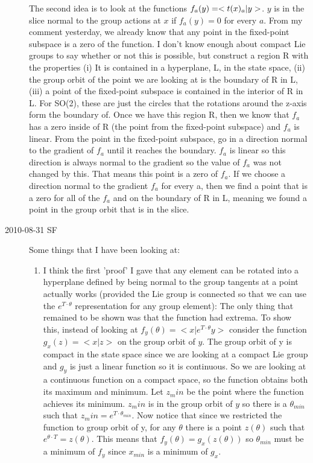 \begin{description}
The second idea is to look at the functions $f_a(y)=<t(x)_a| y>$. $ y$ is in the slice normal to the group actions at $x$ if $f_a(y)=0$ for every $a$. From my comment yesterday, we already know that any point in the fixed-point subspace is a zero of the function. I don't know enough about compact Lie groups to say whether or not this is possible, but construct a region R with the properties (i) It is contained in a hyperplane, L, in the state space, (ii) the group orbit of the point we are looking at is the boundary of R in L, (iii) a point of the fixed-point subspace is contained in the interior of R in L. For SO(2), these are just the circles that the rotations around the z-axis form the boundary of. Once we have this region R, then we know that $f_a$ has a zero inside of R (the point from the fixed-point subspace) and $f_a$ is linear. From the point in the fixed-point subspace, go in a direction normal to the gradient of $f_a$ until it reaches the boundary. $f_a$ is linear so this direction is always normal to the gradient so the value of $f_a$ was not changed by this. That means this point is a zero of $f_a$. If we choose a direction normal to the gradient $f_a$ for every a, then we find a point that is a zero for all of the $f_a$ and on the boundary of R in L, meaning we found a point in the group orbit that is in the slice.

\item[2010-08-31 SF]
Some things that I have been looking at:

\begin{enumerate}
\item
I think the first 'proof' I gave that any element can be rotated into a hyperplane defined by being normal to the group tangents at a point actually works (provided the Lie group is connected so that we can use the $e^{T \cdot \theta}$ representation for any group element): The only thing that remained to be shown was that the function had extrema. To show this, instead of looking at $f_y(\theta)=<x|e^{T \cdot \theta} y>$ consider the function $g_x(z)=<x|z>$ on the group orbit of $y$. The group orbit of y is compact in the state space since we are looking at a compact Lie group and $g_y$ is just a linear function so it is continuous. So we are looking at a continuous function on a compact space, so the function obtains both its maximum and minimum. Let $z_min$ be the point where the function achieves its minimum. $z_min$ is in the group orbit of $y$ so there is a $\theta_{min}$ such that $z_min=e^{T \cdot \theta_{min}}$. Now notice that since we restricted the function to group orbit of y, for any $\theta$ there is a point $z(\theta)$ such that $e^{\theta \cdot T}=z(\theta)$. This means that $f_y(\theta)=g_x(z(\theta))$ so $\theta_{min}$ must be a minimum of $f_y$ since $x_{min}$ is a minimum of $g_x$.


\end{enumerate}
\end{description}
